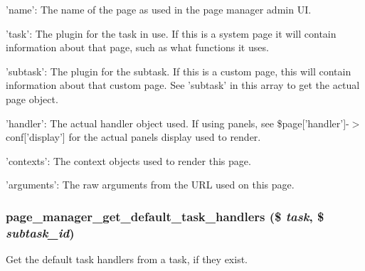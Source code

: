 \begin{DoxyItemize}
\item 'name': The name of the page as used in the page manager admin UI.
\item 'task': The plugin for the task in use. If this is a system page it will contain information about that page, such as what functions it uses.
\item 'subtask': The plugin for the subtask. If this is a custom page, this will contain information about that custom page. See 'subtask' in this array to get the actual page object.
\item 'handler': The actual handler object used. If using panels, see \$page\mbox{[}'handler'\mbox{]}-\/$>$conf\mbox{[}'display'\mbox{]} for the actual panels display used to render.
\item 'contexts': The context objects used to render this page.
\item 'arguments': The raw arguments from the URL used on this page. 
\end{DoxyItemize}\hypertarget{page__manager_8module_a1c50184f40b1e3f5af6da2ffca019d62}{
\subsubsection[{page\_\-manager\_\-get\_\-default\_\-task\_\-handlers}]{\setlength{\rightskip}{0pt plus 5cm}page\_\-manager\_\-get\_\-default\_\-task\_\-handlers (\$ {\em task}, \/  \$ {\em subtask\_\-id})}}
\label{page__manager_8module_a1c50184f40b1e3f5af6da2ffca019d62}
Get the default task handlers from a task, if they exist.

